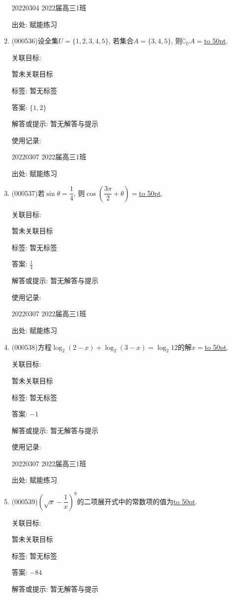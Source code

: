 \documentclass[10pt,a4paper]{article}
\newcommand{\blank}[1]{\underline{\hbox to #1pt{}}}
\begin{document}
\begin{enumerate}[1.]
20220304	2022届高三1班	


出处: 赋能练习
\item { (000536)}设全集$U=\{ 1,2,3,4,5\}$, 若集合$A=\{3,4,5\}$, 则$\complement_U A=$\blank{50}.


关联目标:

暂未关联目标



标签: 暂无标签

答案: $\{1,2\}$

解答或提示: 暂无解答与提示

使用记录:

20220307	2022届高三1班	


出处: 赋能练习
\item { (000537)}若$\sin\theta=\dfrac14$, 则$\cos(\dfrac{3 \pi}2+\theta)=$\blank{50}.


关联目标:

暂未关联目标



标签: 暂无标签

答案: $\frac 14$

解答或提示: 暂无解答与提示

使用记录:

20220307	2022届高三1班	


出处: 赋能练习
\item { (000538)}方程$\log_2(2-x)+\log_2(3-x)=\log_2 12$的解$x=$\blank{50}.


关联目标:

暂未关联目标



标签: 暂无标签

答案: $-1$

解答或提示: 暂无解答与提示

使用记录:

20220307	2022届高三1班	


出处: 赋能练习
\item { (000539)}$(\sqrt x-\dfrac1x)^9$的二项展开式中的常数项的值为\blank{50}.


关联目标:

暂未关联目标



标签: 暂无标签

答案: $-84$

解答或提示: 暂无解答与提示


\end{enumerate}
\end{document}
